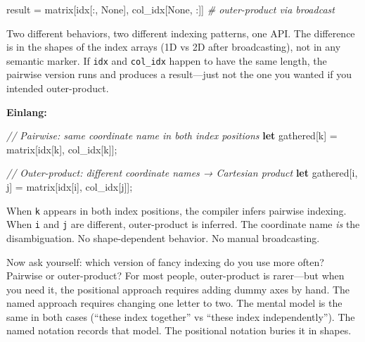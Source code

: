 \documentclass[11pt,titlepage]{article}
\newenvironment{Shaded}{}{}
\newcommand{\CommentTok}[1]{\textcolor[rgb]{0.38,0.63,0.69}{\textit{#1}}}
\newcommand{\KeywordTok}[1]{\textcolor[rgb]{0.00,0.44,0.13}{\textbf{#1}}}
\newcommand{\NormalTok}[1]{#1}
\newcommand{\OperatorTok}[1]{\textcolor[rgb]{0.40,0.40,0.40}{#1}}
\newcommand{\VariableTok}[1]{\textcolor[rgb]{0.10,0.09,0.49}{#1}}
\begin{document}
\begin{Shaded}
\begin{Highlighting}[]
\NormalTok{result }\OperatorTok{=}\NormalTok{ matrix[idx[:, }\VariableTok{None}\NormalTok{], col_idx[}\VariableTok{None}\NormalTok{, :]]  }\CommentTok{# outer-product via broadcast}
\end{Highlighting}
\end{Shaded}

Two different behaviors, two different indexing patterns, one API. The
difference is in the shapes of the index arrays (1D vs 2D after
broadcasting), not in any semantic marker. If \texttt{idx} and
\texttt{col\_idx} happen to have the same length, the pairwise version
runs and produces a result---just not the one you wanted if you intended
outer-product.

\textbf{Einlang:}

\begin{Shaded}
\begin{Highlighting}[]
\CommentTok{// Pairwise: same coordinate name in both index positions}
\KeywordTok{let}\NormalTok{ gathered}\OperatorTok{[}\NormalTok{k}\OperatorTok{]}\NormalTok{ = matrix}\OperatorTok{[}\NormalTok{idx}\OperatorTok{[}\NormalTok{k}\OperatorTok{]}\NormalTok{, col_idx}\OperatorTok{[}\NormalTok{k}\OperatorTok{]]}\NormalTok{;}

\CommentTok{// Outer-product: different coordinate names → Cartesian product}
\KeywordTok{let}\NormalTok{ gathered}\OperatorTok{[}\NormalTok{i, j}\OperatorTok{]}\NormalTok{ = matrix}\OperatorTok{[}\NormalTok{idx}\OperatorTok{[}\NormalTok{i}\OperatorTok{]}\NormalTok{, col_idx}\OperatorTok{[}\NormalTok{j}\OperatorTok{]]}\NormalTok{;}
\end{Highlighting}
\end{Shaded}

When \texttt{k} appears in both index positions, the compiler infers
pairwise indexing. When \texttt{i} and \texttt{j} are different,
outer-product is inferred. The coordinate name \emph{is} the
disambiguation. No shape-dependent behavior. No manual broadcasting.

Now ask yourself: which version of fancy indexing do you use more often?
Pairwise or outer-product? For most people, outer-product is rarer---but
when you need it, the positional approach requires adding dummy axes by
hand. The named approach requires changing one letter to two. The mental
model is the same in both cases (``these index together'' vs ``these
index independently''). The named notation records that model. The
positional notation buries it in shapes.
\end{document}
